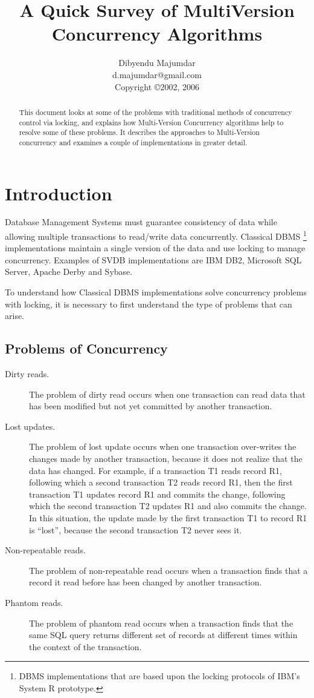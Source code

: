 \documentclass{article}
\title{A Quick Survey of MultiVersion Concurrency Algorithms}
\author{Dibyendu Majumdar \\
d.majumdar@gmail.com \\
Copyright \copyright 2002, 2006}
\begin{document}
\maketitle

\begin{abstract}
This document looks at some of the problems with traditional methods
of concurrency control via locking, and explains how Multi-Version
Concurrency algorithms help to resolve some of these problems. It
describes the approaches to Multi-Version concurrency and examines a
couple of implementations in greater detail.
\end{abstract}

\section{Introduction}
Database Management Systems must guarantee consistency of data while
allowing multiple transactions to read/write data concurrently.
Classical DBMS \footnote{DBMS implementations that are based upon
the locking protocols of IBM's System R prototype.} implementations
maintain a single version of the data and use locking to manage
concurrency. Examples of SVDB implementations are IBM DB2, Microsoft 
SQL Server, Apache Derby and Sybase.

To understand how Classical DBMS implementations solve concurrency
problems with locking, it is necessary to first understand the type
of problems that can arise.

\subsection{Problems of Concurrency}
\begin{description}
\item[Dirty reads.] The problem of dirty read occurs when one transaction can
read data that has been modified but not yet committed by another
transaction.
\item[Lost updates.] The problem of lost update occurs when one transaction
over-writes the changes made by another transaction, because it does
not realize that the data has changed. For example, if a transaction
T1 reads record R1, following which a second transaction T2 reads
record R1, then the first transaction T1 updates record R1 and
commits the change, following which the second transaction T2
updates R1 and also commits the change. In this situation, the
update made by the first transaction T1 to record R1 is ``lost'',
because the second transaction T2 never sees it.
\item[Non-repeatable reads.] The problem of non-repeatable read occurs when a
transaction finds that a record it read before has been changed by
another transaction.
\item[Phantom reads.] The problem of phantom read occurs when a transaction finds
that the same SQL query returns different set of records at
different times within the context of the transaction.
\end{description}
\end{document}
